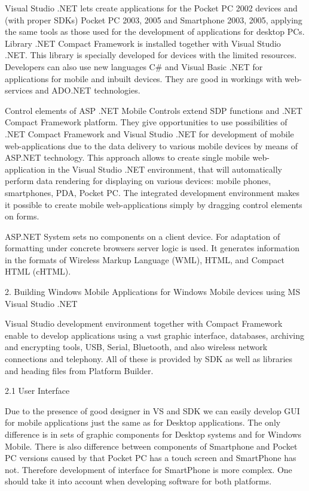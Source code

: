 Visual Studio .NET lets create applications for the Pocket PC 2002 devices and
(with proper SDKs) Pocket PC 2003, 2005 and Smartphone 2003, 2005, applying the
same tools as those used for the development of applications for desktop PCs.
Library .NET Compact Framework is installed together with Visual Studio .NET.
This library is specially developed for devices with the limited resources.
Developers can also use new languages C\# and Visual Basic .NET for applications
for mobile and inbuilt devices. They are good in workings with web-services and
ADO.NET technologies.

Control elements of ASP .NET Mobile Controls extend SDP functions and .NET
Compact Framework platform. They give opportunities to use possibilities of .NET
Compact Framework and Visual Studio .NET for development of mobile
web-applications due to the data delivery to various mobile devices by means of
ASP.NET technology. This approach allows to create single mobile web-application
in the Visual Studio .NET environment, that will automatically perform data
rendering for displaying on various devices: mobile phones, smartphones, PDA,
Pocket PC. The integrated development environment makes it possible to create
mobile web-applications simply by dragging control elements on forms.

ASP.NET System sets no components on a client device. For adaptation of
formatting under concrete browsers server logic is used. It generates information
in the formats of Wireless Markup Language (WML), HTML, and Compact HTML (cHTML).

 2. Building Windows Mobile Applications for Windows Mobile devices using MS
 Visual Studio .NET

Visual Studio development environment together with Compact Framework enable to
develop applications using a vast graphic interface, databases, archiving and
encrypting tools,  USB, Serial, Bluetooth, and also wireless network connections
and telephony. All of these is provided by SDK as well as libraries and heading
files from Platform Builder.

2.1 User Interface

Due to the presence of good designer in VS and SDK we can easily develop GUI for
mobile applications just the same as for Desktop applications. The only
difference is in sets of  graphic components for Desktop systems and for Windows
Mobile. There is also difference between components of Smartphone and Pocket PC
versions caused by that Pocket PC has a touch screen and SmartPhone has not.
Therefore development of interface for SmartPhone is more complex. One should
take it into account when developing software for both platforms.

